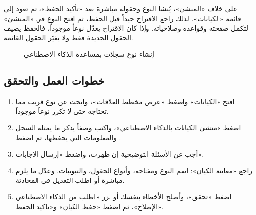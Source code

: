 \begin{rcwarn}
على خلاف «المنشئ»، يُنشأ النوع وحقوله مباشرة بعد «تأكيد الحفظ»، ثم تعود إلى قائمة «الكيانات». لذلك راجع الاقتراح جيداً قبل الحفظ، ثم افتح النوع في «المنشئ» لتكمل صفحته وقواعده وصلاحياته. وإذا كان الاقتراح يعدّل نوعاً موجوداً، فالحفظ يضيف الحقول الجديدة فقط ولا يغيّر الحقول القائمة.
\end{rcwarn}

\begin{figure}[H]
\centering
{}
\rclegend
\caption{إنشاء نوع سجلات بمساعدة الذكاء الاصطناعي}
\label{fig:builder-ai-builder-flow}
\end{figure}

\subsection{خطوات العمل والتحقق}
\begin{enumerate}
\item افتح «الكيانات» واضغط «عرض مخطط العلاقات»، وابحث عن نوع قريب مما تحتاجه حتى لا تكرر نوعاً موجوداً.
\item اضغط «منشئ الكيانات بالذكاء الاصطناعي»، واكتب وصفاً يذكر ما يمثله السجل والمعلومات التي يحفظها، ثم اضغط .
\item أجب عن الأسئلة التوضيحية إن ظهرت، واضغط «إرسال الإجابات».
\item راجع «معاينة الكيان»: اسم النوع ومفتاحه، وأنواع الحقول، والتبويبات. وعدّل ما يلزم مباشرة أو اطلب التعديل في المحادثة.
\item اضغط «تحقق»، وأصلح الأخطاء بنفسك أو بزر «اطلب من الذكاء الاصطناعي الإصلاح»، ثم اضغط «حفظ الكيان» و«تأكيد الحفظ».
\end{enumerate}

